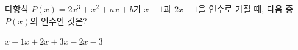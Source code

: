 다항식 $P(x)=2x^3+x^2+ax+b$가 $x-1$과 $2x-1$을 인수로 가질 때, 다음 중 $P(x)$의 인수인 것은? 
\begin{choices32}{$x+1$}{$x+2$}{$x+3$}{$x-2$}{$x-3$}\end{choices32}
